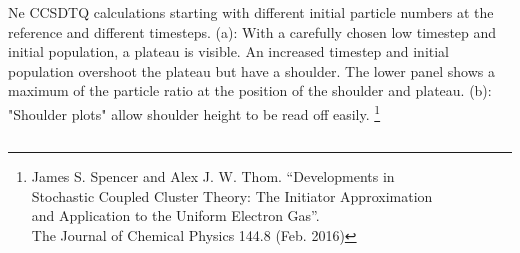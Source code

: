 \documentclass{beamer}
\begin{document}
\begin{frame}
\begin{columns}
\begin{column}{0.40\textwidth}
	\tiny Ne CCSDTQ calculations starting with different initial
	particle numbers at the reference and different timesteps. (a): With a carefully
	chosen low timestep and initial population, a plateau is visible. An increased
	timestep and initial population overshoot the plateau but have a shoulder.
	The lower panel shows a maximum of the particle ratio at the position of the
	shoulder and plateau. (b): "Shoulder plots" allow shoulder height to be read off
	easily.  \footnote{\tiny James S. Spencer and Alex J. W. Thom. “Developments in\\ Stochastic
		Coupled Cluster Theory: The Initiator Approximation\\ and Application to the
		Uniform Electron Gas”.\\ The Journal of Chemical Physics 144.8 (Feb.
		2016)}
\end{column}
\end{columns}	
\end{frame}
\end{document}
